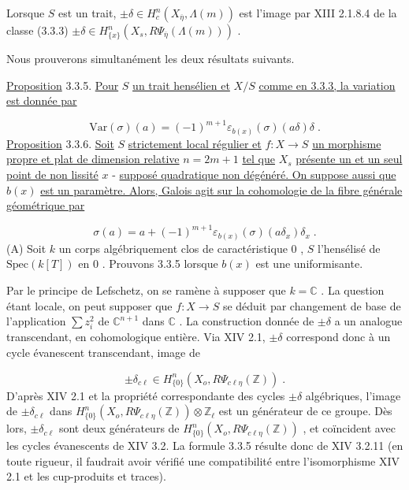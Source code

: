Lorsque $S$ est un trait, $\pm \delta \in H^n_c(X_{\overline{\eta}},\Lambda(m))$ est l'image par XIII 2.1.8.4 de la classe (3.3.3) $\pm \delta \in H^n_{\{x\}}(X_s,R\Psi_{\overline{\eta}}(\Lambda(m)))$ .

Nous prouverons simultanément les deux résultats suivants.

\underline{Proposition} 3.3.5. \underline{Pour} $S$ \underline{un trait hensélien et} $X/S$ \underline{comme en 3.3.3, la variation est donnée par}

\begin{equation*}
\mathrm{Var}(\sigma)(a) = (-1)^{m+1} \varepsilon_{b(x)}(\sigma)(a\delta)\delta \;.
\end{equation*}
\underline{Proposition} 3.3.6. \underline{Soit} $S$ \underline{strictement local régulier et} $f : X \to S$ \underline{un morphisme propre et plat de dimension relative} $n = 2m + 1$ \underline{tel que} $X_s$ \underline{présente un et un seul point de non lissité} $x$ - \underline{supposé quadratique non dégénéré. On suppose aussi que} $b(x)$ \underline{est un paramètre. Alors, Galois agit sur la cohomologie de la fibre générale géométrique par}

\begin{equation*}
\sigma(a) = a+(-1)^{m+1} \varepsilon_{b(x)}(\sigma)(a\delta_x)\delta_x \;.
\end{equation*}
(A) Soit $k$ un corps algébriquement clos de caractéristique $0$ , $S$ l'hensélisé
de $\mathrm{Spec}(k[T])$ en $0$ . Prouvons 3.3.5 lorsque $b(x)$ est une uniformisante.

Par le principe de Lefschetz, on se ramène à supposer que $k = \mathbb{C}$ . La question étant locale, on peut supposer que $f : X \to S$ se déduit par changement de base de l'application $\sum z_i^2$ de $\mathbb{C}^{n+1}$ dans $\mathbb{C}$ . La construction donnée de $\pm \delta$ a un analogue transcendant, en cohomologique entière. Via XIV 2.1, $\pm \delta$ correspond donc à un cycle évanescent transcendant, image de

\begin{equation*}
\pm \delta_{c\ell} \in H^{n}_{\{0\}}(X_o,R\Psi_{c\ell\eta}(\mathbb{Z})) \;.
\end{equation*}
D'après XIV 2.1 et la propriété correspondante des cycles $\pm \delta$ algébriques, l'image de $\pm \delta_{c\ell}$ dans $H^n_{\{0\}}(X_o,R\Psi_{c\ell\eta}(\mathbb{Z})) \otimes \mathbb{Z}_\ell$ est un générateur de ce groupe. Dès lors, $\pm \delta_{c\ell}$ sont deux générateurs de $H^n_{\{0\}}(X_o,R\Psi_{c\ell\eta}(\mathbb{Z}))$ , et coïncident avec les cycles évanescents de XIV 3.2. La formule 3.3.5 résulte donc de XIV 3.2.11 (en toute rigueur, il faudrait avoir vérifié une compatibilité entre l'isomorphisme XIV 2.1 et les cup-produits et traces).


